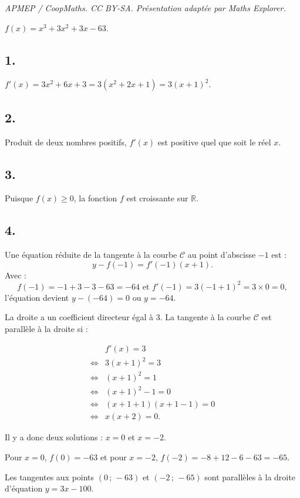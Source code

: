 \documentclass[10pt]{article}
\begin{document}
\noindent\textit{APMEP / CoopMaths. CC BY-SA. Présentation adaptée par Maths Explorer.}\par\medskip
\( f(x) = x^3 + 3x^2 + 3x - 63 \).

\subsection*{1.}

\(f'(x) = 3x^2 + 6x + 3 = 3(x^2 + 2x + 1) = 3(x + 1)^2\).

\subsection*{2.}

Produit de deux nombres positifs, \(f'(x)\) est positive quel que soit le réel \(x\).

\subsection*{3.}

Puisque \(f(x) \geqslant 0\), la fonction \(f\) est croissante sur \(\mathbb{R}\).

\subsection*{4.}

Une équation réduite de la tangente à la courbe \( \mathcal{C} \) au point d'abscisse \(-1\) est :
\[
y - f(-1) = f'(-1)(x + 1).
\]
Avec :
\[
f(-1) = -1 + 3 - 3 - 63 = -64 \text{ et } f'(-1) = 3(-1 + 1)^2 = 3 \times 0 = 0,
\]
l'équation devient \(y - (-64) = 0\) ou \(y = -64\).

La droite a un coefficient directeur égal à 3. La tangente à la courbe \( \mathcal{C} \) est parallèle à la droite si :

\begin{align*}
&f'(x) = 3 \\
\iff &3(x + 1)^2 = 3 \\
\iff &(x + 1)^2 = 1 \\
\iff &(x + 1)^2 - 1 = 0 \\
\iff &(x + 1 + 1)(x + 1 - 1) = 0 \\
\iff &x(x + 2) = 0.
\end{align*}

Il y a donc deux solutions : \( x = 0 \) et \( x = -2 \).

Pour \( x = 0 \), \( f(0) = -63 \) et pour \( x = -2 \), \( f(-2) = -8 + 12 - 6 - 63 = -65 \). 

Les tangentes aux points \( (0 \,;\, -63) \) et \( (-2 \,;\, -65) \) sont parallèles à la droite d'équation \( y = 3x - 100 \).
\end{document}

